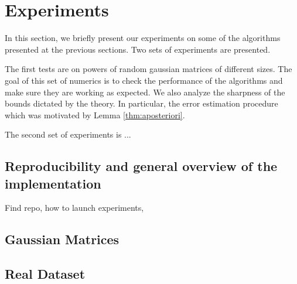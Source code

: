 \section*{Experiments}
In this section, we briefly present our experiments on some of the 
algorithms presented at the previous sections. Two sets of experiments are presented.

The first tests are on powers
of random gaussian matrices of different sizes. The goal of this set of numerics
is to check the performance of the algorithms and make sure they are working
as expected. We also analyze the sharpness of the bounds dictated by the theory.
In particular, the error estimation procedure which was motivated by 
Lemma \ref{thm:aposteriori}.

The second set of experiments is ...

\subsection{Reproducibility and general overview of the implementation}
Find repo, how to launch experiments, 
\subsection{Gaussian Matrices}
\label{sec:gaussian-matrices}
\subsection{Real Dataset}